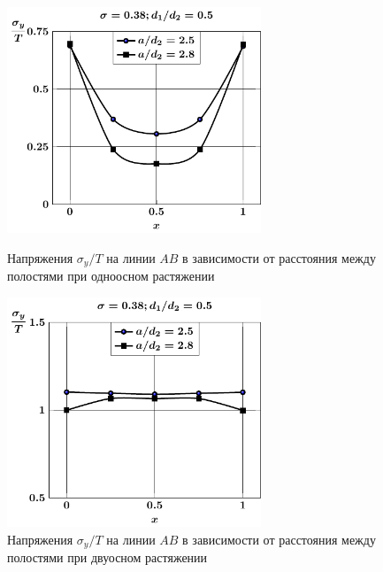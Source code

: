 \begin{russian}
\begin{figure}[h!]
\centering\footnotesize
\parbox[b]{7.5cm}{\centering\includegraphics[width=7.6cm]{periodic-oblate-cav27-a-d50-t1-sig_y.pdf}
\caption{Напряжения $\sigma_y/T$ на линии $AB$ в зависимости от расстояния между полостями при одноосном растяжении
\label{f:11:37}}}\hfil\hfil
\parbox[b]{7.5cm}{\centering\includegraphics[width=7.6cm]{periodic-oblate-cav27-a-d50-t2-sig_y.pdf}
\caption{Напряжения $\sigma_y/T$ на линии $AB$ в зависимости от расстояния между полостями при двуосном растяжении
\label{f:11:38}}}
\end{figure}


\end{russian}
